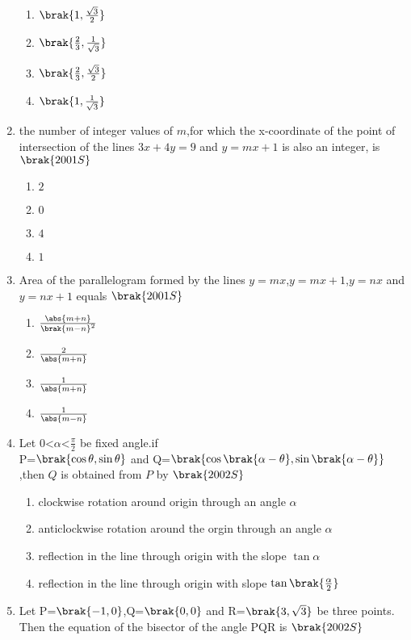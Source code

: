 \begin{enumerate}
\begin{enumerate}
     \item $\brak{1,\frac{\sqrt{3}}{2}}$
     \item $\brak{\frac{2}{3},\frac{1}{\sqrt{3}}}$
     \item $\brak{\frac{2}{3},\frac{\sqrt{3}}{2}}$
     \item $\brak{1,\frac{1}{\sqrt{3}}}$
    
\end{enumerate}
\item the number of integer values of $m$,for which the x-coordinate of the point of intersection of the lines $3x+4y=9$ and $y=mx+1$ is also an integer, is 
\hfill{$\brak{2001S}$}
\begin{enumerate}
    
    \item $2$
    \item $0$
     \item $4$
     \item $1$
    
\end{enumerate}
\item Area of the parallelogram formed by the lines $y=mx$,$y=mx+1$,$y=nx$ and $y=nx+1$ equals
\hfill{$\brak{2001S}$}
\begin{enumerate}
    
     \item $\frac{\abs{m+n}}{\brak{m-n}^2}$
     \item $\frac{2}{\abs{m+n}}$
     \item $\frac{1}{\abs{m+n}}$
     \item $\frac{1}{\abs{m-n}}$
    
\end{enumerate}
\item Let $0$\textless $\alpha $\textless $\frac{\pi}{2}$ be fixed angle.if\\
P=$\brak{\cos\theta,\sin\theta}$ and Q=$\brak{\cos\brak{\alpha-\theta},\sin\brak{\alpha-\theta}}$,then $Q$ is obtained from $P$ by
\hfill{$\brak{2002S}$}
\begin{enumerate}
    \item clockwise rotation around origin through an angle $\alpha$
    \item anticlockwise rotation around the orgin through an angle $\alpha$
    \item reflection in the line through origin with the slope $\tan\alpha$
    \item reflection in the line through origin with slope $\tan\brak{\frac{\alpha}{2}}$
\end{enumerate}
\item Let P=$\brak{-1,0}$,Q=$\brak{0,0}$ and R=$\brak{3,\sqrt{3}}$ be three points. Then the equation of the bisector of the angle PQR is 
\hfill{$\brak{2002S}$}
\begin{enumerate}
    

\end{enumerate}
\end{enumerate}

